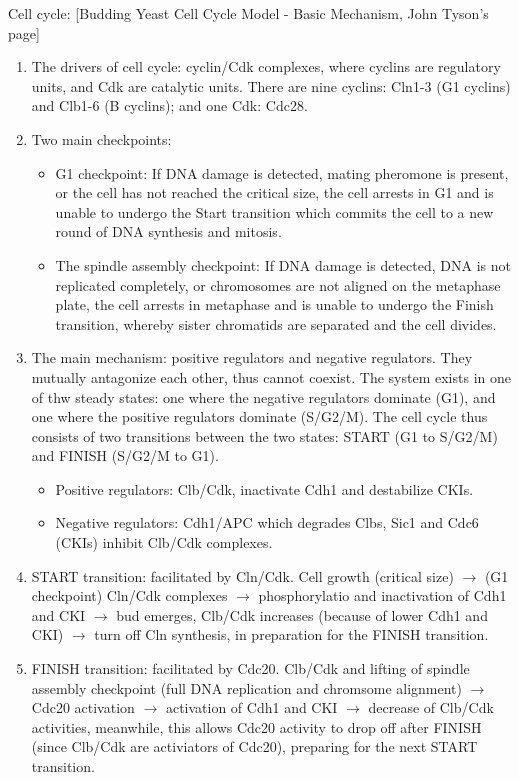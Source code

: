 \documentclass{report}
\begin{document}
Cell cycle: [Budding Yeast Cell Cycle Model - Basic Mechanism, John Tyson's page]
\begin{enumerate}
	\item The drivers of cell cycle: cyclin/Cdk complexes, where cyclins are regulatory units, and Cdk are catalytic units. There are nine cyclins: Cln1-3 (G1 cyclins) and Clb1-6 (B cyclins); and one Cdk: Cdc28. 
	
	\item Two main checkpoints: 
	\begin{itemize}
		\item G1 checkpoint: If DNA damage is detected, mating pheromone is present, or the cell has not reached the critical size, the cell arrests in G1 and is unable to undergo the Start transition which commits the cell to a new round of DNA synthesis and mitosis. 
		\item The spindle assembly checkpoint: If DNA damage is detected, DNA is not replicated completely, or chromosomes are not aligned on the metaphase plate, the cell arrests in metaphase and is unable to undergo the Finish transition, whereby sister chromatids are separated and the cell divides.
	\end{itemize}
	
	\item The main mechanism: positive regulators and negative regulators. They mutually antagonize each other, thus cannot coexist. The system exists in one of thw steady states: one where the negative regulators dominate (G1), and one where the positive regulators dominate (S/G2/M). The cell cycle thus consists of two transitions between the two states: START (G1 to S/G2/M) and FINISH (S/G2/M to G1). 
	\begin{itemize}
		\item Positive regulators: Clb/Cdk, inactivate Cdh1 and destabilize CKIs.
		\item Negative regulators: Cdh1/APC which degrades Clbs, Sic1 and Cdc6 (CKIs) inhibit Clb/Cdk complexes. 
	\end{itemize}
	
	\item START transition: facilitated by Cln/Cdk. Cell growth (critical size) $\rightarrow$ (G1 checkpoint) Cln/Cdk complexes $\rightarrow$ phosphorylatio and inactivation of Cdh1 and CKI $\rightarrow$ bud emerges, Clb/Cdk increases (because of lower Cdh1 and CKI) $\rightarrow$ turn off Cln synthesis, in preparation for the FINISH transition. 
	
	\item FINISH transition: facilitated by Cdc20. Clb/Cdk and lifting of spindle assembly checkpoint (full DNA replication and chromsome alignment) $\rightarrow$ Cdc20 activation $\rightarrow$ activation of Cdh1 and CKI $\rightarrow$ decrease of Clb/Cdk activities, meanwhile, this allows Cdc20 activity to drop off after FINISH (since Clb/Cdk are activiators of Cdc20), preparing for the next START transition. 
	

\end{enumerate}
\end{document}
